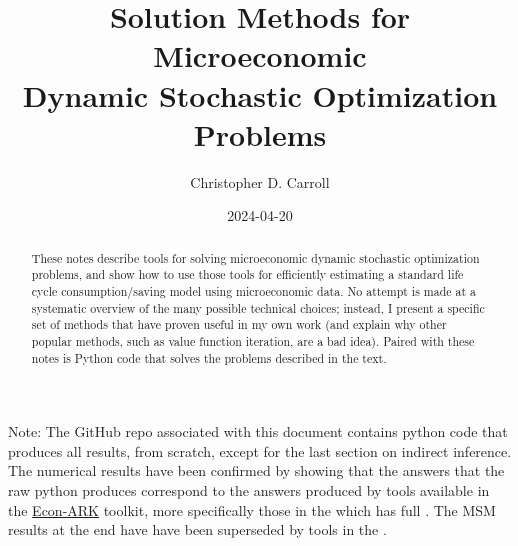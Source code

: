 \documentclass[titlepage, headings=optiontotocandhead]{Resources/texmf-local/tex/latex/econtex}
\begin{document}


\title{Solution Methods for Microeconomic \\ Dynamic Stochastic Optimization Problems}

\author{Christopher D. Carroll\authNum}


\date{2024-04-20}
\maketitle
\footnotesize

\noindent  Note: The GitHub repo {\SMDSOPrepo} associated with this document contains python code that produces all results, from scratch, except for the last section on indirect inference.  The numerical results have been confirmed by showing that the answers that the raw python produces correspond to the answers produced by tools available in the {\href{https://econ-ark.org}{{Econ-ARK}}} toolkit, more specifically those in the {\HARKrepo} which has full {\HARKdocs}.  The MSM results at the end have have been superseded by tools in the {\EMDSOPrepo}.

\normalsize

\hypertarget{abstract}{}
\begin{abstract}
  These notes describe tools for solving microeconomic dynamic stochastic optimization problems, and show how to use those tools for efficiently estimating a standard life cycle consumption/saving model using microeconomic data.  No attempt is made at a systematic overview of the many possible technical choices; instead, I present a specific set of methods that have proven useful in my own work (and explain why other popular methods, such as value function iteration, are a bad idea).  Paired with these notes is Python code that solves the problems described in the text.
\end{abstract}
\end{document}
